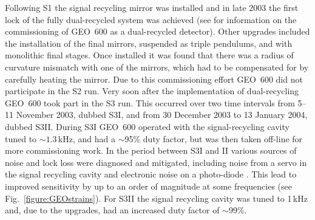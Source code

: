 \documentclass{article}
\begin{document}

Following S1 the signal recycling mirror was installed and in late 2003 the
first lock of the fully dual-recycled system was achieved (see
\cite{Smith:2004, Willke:2004, Grote:2005} for information on the commissioning
of GEO~600 as a dual-recycled detector). Other upgrades included the
installation of the final mirrors, suspended as triple pendulums, and with
monolithic final stages. Once installed it was found that there was a radius of
curvature mismatch with one of the mirrors, which had to be compensated for by
carefully heating the mirror. Due to this commissioning effort GEO~600 did not
participate in the S2 run. Very soon after the implementation of dual-recycling
GEO~600 took part in the S3 run. This occurred over two time intervals
from 5--11 November 2003, dubbed S3I, and from 30 December 2003 to 13 January
2004, dubbed S3II. During S3I GEO~600 operated with the signal-recycling
cavity tuned to $\sim 1.3$\,kHz, and had a $\sim$95\% duty factor, but was then
taken off-line for more commissioning work. In the period between S3I and II
various sources of noise and lock loss were diagnosed and mitigated, including
noise from a servo in the signal recycling cavity and electronic noise on a
photo-diode \cite{Smith:2004}. This lead to improved sensitivity by up to an
order of magnitude at some frequencies (see Fig.~\ref{figure:GEOstrains}). For
S3II the signal recycling cavity was tuned to 1\,kHz and, due to the upgrades,
had an increased duty factor of $\sim$99\%.
\end{document}
